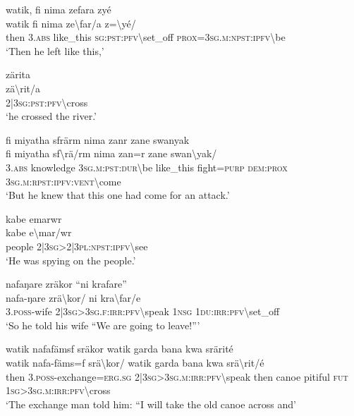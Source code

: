\ea\label{ex:5:a1523}
watik, fi nima zefara zyé\\
\gll watik	fi	nima	ze{\textbackslash}far/a	z={\textbackslash}yé/\\
     then	3.\textsc{abs}	like\_this	\textsc{sg}:\textsc{pst}:\textsc{pfv}{\textbackslash}set\_off	\textsc{prox}=3\textsc{sg}.\textsc{m}:\textsc{npst}:\textsc{ipfv}{\textbackslash}be\\
\glt `Then he left like this,'
\z

\ea\label{ex:5:a1524}
zärita\\
\gll zä{\textbackslash}rit/a\\
     2|3\textsc{sg}:\textsc{pst}:\textsc{pfv}{\textbackslash}cross\\
\glt `he crossed the river.'
\z

\ea\label{ex:5:a1525}
fi miyatha sfrärm nima zanr zane swanyak\\
\gll fi	miyatha	sf{\textbackslash}rä/rm	nima	zan=r	zane	swan{\textbackslash}yak/\\
     3.\textsc{abs}	knowledge	3\textsc{sg}.\textsc{m}:\textsc{pst}:\textsc{dur}{\textbackslash}be	like\_this	fight=\textsc{purp}	\textsc{dem}:\textsc{prox}	3\textsc{sg}.\textsc{m}:\textsc{rpst}:\textsc{ipfv}:\textsc{vent}{\textbackslash}come\\
\glt `But he knew that this one had come for an attack.'
\z

\ea\label{ex:5:a1527}
kabe emarwr\\
\gll kabe	e{\textbackslash}mar/wr\\
     people	2|3\textsc{sg}>2|3\textsc{pl}:\textsc{npst}:\textsc{ipfv}{\textbackslash}see\\
\glt `He was spying on the people.'
\z

\ea\label{ex:5:a1528}
nafaŋare zräkor ``ni krafare''\\
\gll nafa-ŋare	zrä{\textbackslash}kor/	ni	kra{\textbackslash}far/e\\
     3.\textsc{poss}-wife	2|3\textsc{sg}>3\textsc{sg}.\textsc{f}:\textsc{irr}:\textsc{pfv}{\textbackslash}speak	1\textsc{nsg}	1\textsc{du}:\textsc{irr}:\textsc{pfv}{\textbackslash}set\_off\\
\glt `So he told his wife ``We are going to leave!'''
\z

\ea\label{ex:5:a1529}
watik nafafämsf sräkor watik garda bana kwa srärité\\
\gll watik	nafa-fäms=f	srä{\textbackslash}kor/	watik	garda	bana	kwa	srä{\textbackslash}rit/é\\
     then	3.\textsc{poss}-exchange=\textsc{erg}.\textsc{sg}	2|3\textsc{sg}>3\textsc{sg}.\textsc{m}:\textsc{irr}:\textsc{pfv}{\textbackslash}speak	then	canoe	pitiful	\textsc{fut}	1\textsc{sg}>3\textsc{sg}.\textsc{m}:\textsc{irr}:\textsc{pfv}{\textbackslash}cross\\
\glt `The exchange man told him: ``I will take the old canoe across and'
\z

